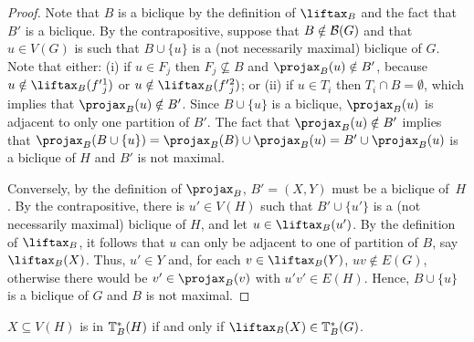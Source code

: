 \begin{proof}
    Note that $B$ is a biclique by the definition of $\Lift{B}$ and the fact that $B'$ is a biclique. By the contrapositive, suppose that $B \notin \mathcal{B}(G)$ and that $u \in V(G)$ is such that $B \cup \{u\}$ is a (not necessarily maximal) biclique of $G$. Note that either:
    (i) if $u \in F_j$ then $F_j \nsubseteq B$ and $\Proj{B}(u) \notin B'$, because $u \notin \Lift{B}(f'{_j^1})$ or $u \notin \Lift{B}(f'{_j^2})$;
    or (ii) if $u \in T_i$ then $T_i \cap B = \emptyset$, which implies that $\Proj{B}(u) \notin B'$.
    Since $B \cup \{u\}$ is a biclique, $\Proj{B}(u)$ is adjacent to only one partition of $B'$.
    The fact that $\Proj{B}(u) \notin B'$ implies that $\Proj{B}(B \cup \{u\}) = \Proj{B}(B) \cup \Proj{B}(u) = B' \cup \Proj{B}(u)$ is a biclique of $H$ and $B'$ is not maximal.
    
    Conversely, by the definition of $\Proj{B}$, $B' = (X, Y)$ must be a biclique of~$H$. By the contrapositive, there is $u' \in V(H)$ such that $B' \cup \{u'\}$ is a (not necessarily maximal) biclique of $H$, and let $u \in \Lift{B}(u')$. By the definition of $\Lift{B}$, it follows that $u$ can only be adjacent to one of partition of $B$, say $\Lift{B}(X)$. Thus, $u' \in Y$ and, for each $v \in \Lift{B}(Y)$, $uv \notin E(G)$, otherwise there would be $v' \in \Proj{B}(v)$ with $u'v' \in E(H)$. Hence, $B \cup \{u\}$ is a biclique of $G$ and $B$ is not maximal.
\end{proof}


\begin{theorem}
    \label{thm:lifted_transversal}
    $X \subseteq V(H)$ is in $\mathbb{T}^*_{B}(H)$ if and only if $\Lift{B}(X) \in \transs{B}(G)$.
\end{theorem}

